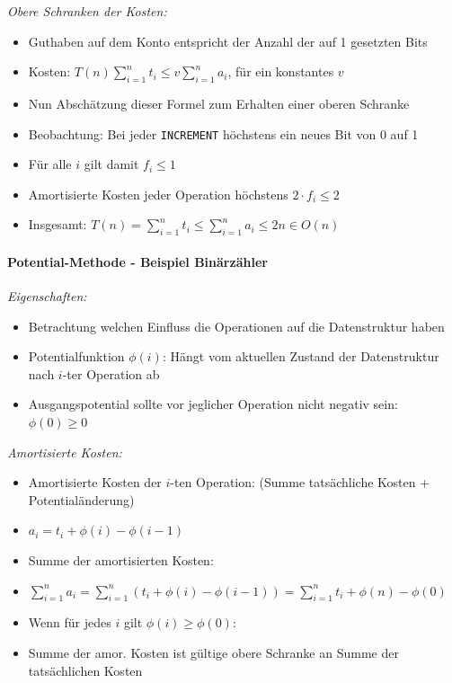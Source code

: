\documentclass[
    ngerman,
    color=3b,
    load_common, %
    summary,
    boxarc,
]{rubos-tuda-template}
\begin{document}
\textit{Obere Schranken der Kosten:}
          \begin{itemize}
              \item Guthaben auf dem Konto entspricht der Anzahl der auf 1 gesetzten Bits
              \item Kosten: $T(n) \sum^n_{i=1} t_i \leq v\sum^n_{i=1} a_i$, für ein konstantes $v$
              \item Nun Abschätzung dieser Formel zum Erhalten einer oberen Schranke
              \item Beobachtung: Bei jeder \texttt{INCREMENT} höchstens ein neues Bit von 0 auf 1
              \item Für alle $i$ gilt damit $f_i \leq 1$
              \item Amortisierte Kosten jeder Operation höchstens $2 \cdot f_i \leq 2$
              \item Insgesamt: $T(n) = \sum^n_{i=1} t_i \leq \sum^n_{i=1} a_i \leq 2n \in O(n)$
          \end{itemize}

\pagebreak

\paragraph{Potential-Methode - Beispiel Binärzähler}\mbox{}

\textit{Eigenschaften:}
\begin{itemize}
    \item Betrachtung welchen Einfluss die Operationen auf die Datenstruktur haben
    \item Potentialfunktion $\phi(i)$: Hängt vom aktuellen Zustand der Datenstruktur nach $i$-ter Operation ab
    \item Ausgangspotential sollte vor jeglicher Operation nicht negativ sein: $\phi(0) \geq 0$
\end{itemize}

\textit{Amortisierte Kosten:}
\begin{itemize}
    \item Amortisierte Kosten der $i$-ten Operation: (Summe tatsächliche Kosten + Potentialänderung)
    \item[] $a_i = t_i + \phi(i) - \phi(i-1)$
    \item Summe der amortisierten Kosten:
    \item[] $\sum^n_{i=1} a_i = \sum^n_{i=1} (t_i + \phi(i) - \phi(i - 1)) = \sum^n_{i=1} t_i + \phi(n) - \phi(0)$
    \item Wenn für jedes $i$ gilt $\phi(i) \geq \phi(0)$:
    \item[] Summe der amor. Kosten ist gültige obere Schranke an Summe der tatsächlichen Kosten
\end{itemize}
\end{document}
